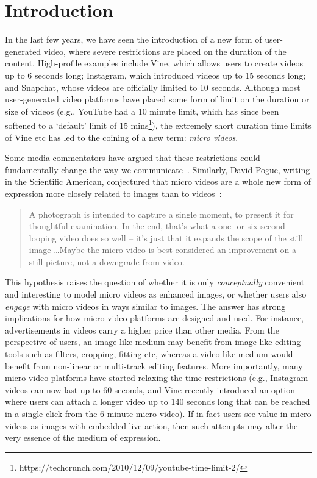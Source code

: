 \section{Introduction}

In the last few years, we have seen the introduction of a new form of user-generated video, where severe restrictions are placed on the duration of the content. High-profile examples include Vine, which allows users to create videos up to 6 seconds long; Instagram, which introduced videos up to 15 seconds long; and Snapchat, whose videos are officially limited to 10 seconds. Although most user-generated video platforms have placed some form of limit on the duration or size of videos (e.g., YouTube had a 10 minute limit, which has since been softened to a `default' limit of 15 mins\footnote{https://techcrunch.com/2010/12/09/youtube-time-limit-2/}), the extremely short duration time limits of Vine etc has led to the coining of a new term: \emph{micro videos}. 


Some media commentators have argued that these restrictions could fundamentally change the way we communicate~\cite{bbc}. Similarly, David Pogue, writing in the Scientific American, conjectured that micro videos are a whole new form of expression more closely related to images than to videos~\cite{pogue13}:
\begin{quotation}
	A photograph is intended to capture a single moment, to present it for thoughtful examination. In the end, that's what a one- or six-second looping video does so well -- it's just that it expands the scope of the still image \ldots Maybe the micro video is best considered an improvement on a still picture, not a downgrade from video.
\end{quotation}

This  hypothesis raises the question of whether it is only \emph{conceptually} convenient and interesting to model  micro videos as enhanced images, or whether users also \emph{engage} with micro videos in ways similar to images. The answer has strong implications for how micro video platforms are designed and used. For instance, advertisements in videos carry a higher price than other media. From the perspective of users, an image-like medium may benefit from image-like editing tools such as filters, cropping, fitting etc, whereas a video-like medium would benefit from non-linear or multi-track editing features. More importantly, many micro video platforms have started relaxing the time restrictions (e.g., Instagram videos can now last up to 60 seconds, and Vine recently introduced an option where users can attach a longer video up to 140 seconds long that can be reached in a single click from the 6 minute micro video). If in fact users see value in micro videos as images with embedded live action, then such attempts may alter  the very essence of the medium of expression. 

